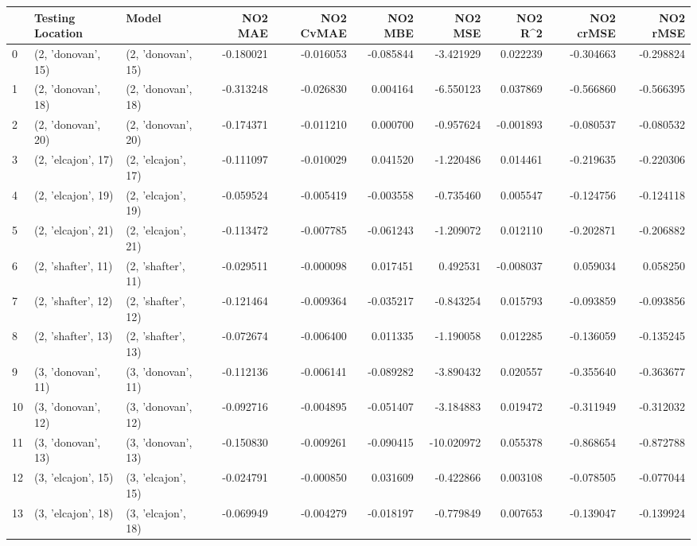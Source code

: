 \begin{tabular}{lllrrrrrrr}
\toprule
{} &    Testing Location &               Model &   NO2 MAE &  NO2 CvMAE &   NO2 MBE &    NO2 MSE &   NO2 R\textasciicircum2 &  NO2 crMSE &  NO2 rMSE \\
\midrule
0  &  (2, 'donovan', 15) &  (2, 'donovan', 15) & -0.180021 &  -0.016053 & -0.085844 &  -3.421929 &  0.022239 &  -0.304663 & -0.298824 \\
1  &  (2, 'donovan', 18) &  (2, 'donovan', 18) & -0.313248 &  -0.026830 &  0.004164 &  -6.550123 &  0.037869 &  -0.566860 & -0.566395 \\
2  &  (2, 'donovan', 20) &  (2, 'donovan', 20) & -0.174371 &  -0.011210 &  0.000700 &  -0.957624 & -0.001893 &  -0.080537 & -0.080532 \\
3  &  (2, 'elcajon', 17) &  (2, 'elcajon', 17) & -0.111097 &  -0.010029 &  0.041520 &  -1.220486 &  0.014461 &  -0.219635 & -0.220306 \\
4  &  (2, 'elcajon', 19) &  (2, 'elcajon', 19) & -0.059524 &  -0.005419 & -0.003558 &  -0.735460 &  0.005547 &  -0.124756 & -0.124118 \\
5  &  (2, 'elcajon', 21) &  (2, 'elcajon', 21) & -0.113472 &  -0.007785 & -0.061243 &  -1.209072 &  0.012110 &  -0.202871 & -0.206882 \\
6  &  (2, 'shafter', 11) &  (2, 'shafter', 11) & -0.029511 &  -0.000098 &  0.017451 &   0.492531 & -0.008037 &   0.059034 &  0.058250 \\
7  &  (2, 'shafter', 12) &  (2, 'shafter', 12) & -0.121464 &  -0.009364 & -0.035217 &  -0.843254 &  0.015793 &  -0.093859 & -0.093856 \\
8  &  (2, 'shafter', 13) &  (2, 'shafter', 13) & -0.072674 &  -0.006400 &  0.011335 &  -1.190058 &  0.012285 &  -0.136059 & -0.135245 \\
9  &  (3, 'donovan', 11) &  (3, 'donovan', 11) & -0.112136 &  -0.006141 & -0.089282 &  -3.890432 &  0.020557 &  -0.355640 & -0.363677 \\
10 &  (3, 'donovan', 12) &  (3, 'donovan', 12) & -0.092716 &  -0.004895 & -0.051407 &  -3.184883 &  0.019472 &  -0.311949 & -0.312032 \\
11 &  (3, 'donovan', 13) &  (3, 'donovan', 13) & -0.150830 &  -0.009261 & -0.090415 & -10.020972 &  0.055378 &  -0.868654 & -0.872788 \\
12 &  (3, 'elcajon', 15) &  (3, 'elcajon', 15) & -0.024791 &  -0.000850 &  0.031609 &  -0.422866 &  0.003108 &  -0.078505 & -0.077044 \\
13 &  (3, 'elcajon', 18) &  (3, 'elcajon', 18) & -0.069949 &  -0.004279 & -0.018197 &  -0.779849 &  0.007653 &  -0.139047 & -0.139924 \\

\end{tabular}
